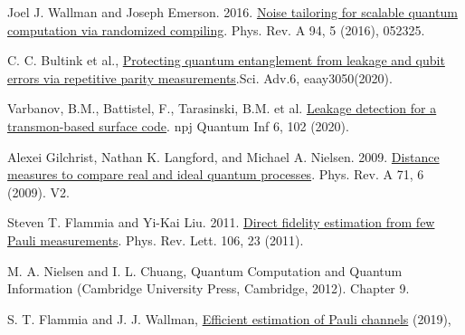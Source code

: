 \documentclass [12pt]{article}
\begin{document}
\begin{thebibliography}{1}
    Joel J. Wallman and Joseph Emerson. 2016. \href{https://arxiv.org/abs/1512.01098}{Noise tailoring for scalable quantum computation via randomized compiling}. Phys. Rev. A 94, 5 (2016), 052325.

    C. C. Bultink et al., \href{https://www.science.org/doi/10.1126/sciadv.aay3050}{Protecting quantum entanglement from leakage and qubit errors via repetitive parity measurements}.Sci. Adv.6, eaay3050(2020).

    Varbanov, B.M., Battistel, F., Tarasinski, B.M. et al. \href{https://www.nature.com/articles/s41534-020-00330-w}{Leakage detection for a transmon-based surface code}. npj Quantum Inf 6, 102 (2020). 



    Alexei Gilchrist, Nathan K. Langford, and Michael A. Nielsen. 2009. \href{https://arxiv.org/abs/quant-ph/0408063}{Distance measures to compare real and ideal quantum processes}. Phys. Rev. A 71, 6 (2009). V2.

    Steven T. Flammia and Yi-Kai Liu. 2011. \href{https://arxiv.org/abs/1104.4695}{Direct fidelity estimation from few Pauli measurements}. Phys. Rev. Lett. 106, 23 (2011).

    M. A. Nielsen and I. L. Chuang, Quantum Computation and Quantum Information (Cambridge University Press, Cambridge, 2012). Chapter 9.


     S. T. Flammia and J. J. Wallman, \href{https://arxiv.org/pdf/1907.12976.pdf}{Efficient estimation of Pauli channels} (2019),
\end{thebibliography}
\end{document}
